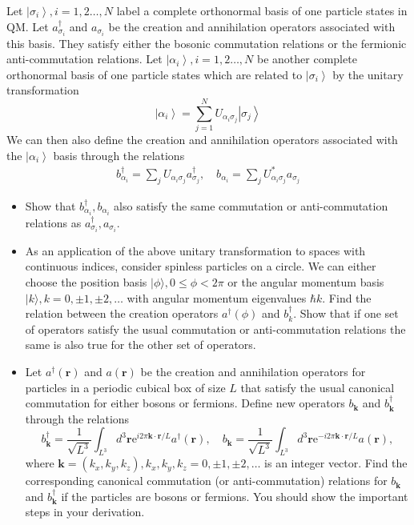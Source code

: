 \begin{homeworkProblem}
Let $\left|\sigma_i\right\rangle, i=1,2 \ldots, N$ label a complete orthonormal basis of one particle states in QM. Let $a_{\sigma_i}^{\dagger}$ and $a_{\sigma_i}$ be the creation and annihilation operators associated with this basis. They satisfy either the bosonic commutation relations or the fermionic anti-commutation relations. Let $\left|\alpha_i\right\rangle, i=1,2 \ldots, N$ be another complete orthonormal basis of one particle states which are related to $\left|\sigma_i\right\rangle$ by the unitary transformation
$$ \left|\alpha_i\right\rangle=\sum_{j=1}^N U_{\alpha_i \sigma_j}\left|\sigma_j\right\rangle $$
We can then also define the creation and annihilation operators associated with the $\left|\alpha_i\right\rangle$ basis through the relations
\begin{align*}
    b_{\alpha_i}^{\dagger}=\sum_j U_{\alpha_i \sigma_j} a_{\sigma_j}^{\dagger}, \quad b_{\alpha_i}=\sum_j U_{\alpha_i \sigma_j}^* a_{\sigma_j} \tag{1}
\end{align*}
\begin{itemize}
    \item[(a)] Show that $b_{\alpha_i}^{\dagger}, b_{\alpha_i}$ also satisfy the same commutation or anti-commutation relations as $a_{\sigma_i}^{\dagger}, a_{\sigma_i}$.
    \item[(b)] As an application of the above unitary transformation to spaces with continuous indices, consider spinless particles on a circle. We can either choose the position basis $|\phi\rangle, 0 \leq \phi<2 \pi$ or the angular momentum basis $|k\rangle, k=0, \pm 1, \pm 2, \ldots$ with angular momentum eigenvalues $\hbar k$. Find the relation between the creation operators $a^{\dagger}(\phi)$ and $b_k^{\dagger}$. Show that if one set of operators satisfy the usual commutation or anti-commutation relations the same is also true for the other set of operators.
    \item[(c)] Let $a^{\dagger}(\mathbf{r})$ and $a(\mathbf{r})$ be the creation and annihilation operators for particles in a periodic cubical box of size $L$ that satisfy the usual canonical commutation for either bosons or fermions. Define new operators $b_{\mathbf{k}}$ and $b_{\mathbf{k}}^{\dagger}$ through the relations
        \begin{equation*}
            b_{\mathbf{k}}^{\dagger}=\frac{1}{\sqrt{L^3}} \int_{L^3} d^3 \mathbf{r} \mathrm{e}^{i 2 \pi \mathbf{k} \cdot \mathbf{r} / L} a^{\dagger}(\mathbf{r}), \quad b_{\mathbf{k}}=\frac{1}{\sqrt{L^3}} \int_{L^3} d^3 \mathbf{r} \mathrm{e}^{-i 2 \pi \mathbf{k} \cdot \mathbf{r} / L} a(\mathbf{r}), \tag{2}
        \end{equation*}
        where $\mathbf{k}=\left(k_x, k_y, k_z\right), k_x, k_y, k_z=0, \pm 1, \pm 2, \ldots$ is an integer vector. Find the corresponding canonical commutation (or anti-commutation) relations for $b_{\mathbf{k}}$ and $b_{\mathbf{k}}^{\dagger}$ if the particles are bosons or fermions. You should show the important steps in your derivation.
\end{itemize}
\end{homeworkProblem}


